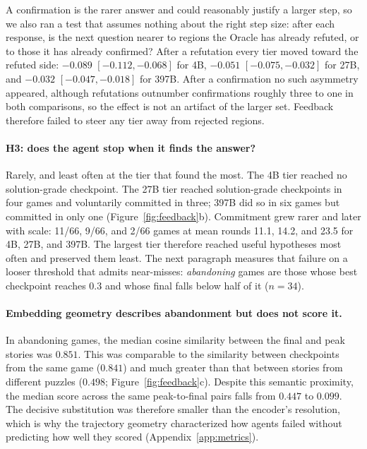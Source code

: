 \documentclass{article}
\begin{document}
A confirmation is the rarer answer and could reasonably justify a larger step,
so we also ran a test that assumes nothing about the right step size: after
each response, is the next question nearer to regions the Oracle has already
refuted, or to those it has already confirmed? After a refutation every tier
moved toward the refuted side: $-0.089$ $[-0.112,-0.068]$ for 4B, $-0.051$
$[-0.075,-0.032]$ for 27B, and $-0.032$ $[-0.047,-0.018]$ for 397B. After a
confirmation no such asymmetry appeared, although refutations outnumber
confirmations roughly three to one in both comparisons, so the effect is not
an artifact of the larger set. Feedback
therefore failed to steer any tier away from rejected regions.

\paragraph{H3: does the agent stop when it finds the answer?}
Rarely, and least often at the tier that found the most. The 4B tier reached no solution-grade checkpoint. The
27B tier reached solution-grade checkpoints in four games and voluntarily
committed in three; 397B did so in six games but committed in only one
(Figure~\ref{fig:feedback}b). Commitment grew rarer and later with
scale: 11/66, 9/66, and 2/66 games at mean rounds 11.1, 14.2, and 23.5 for
4B, 27B, and 397B. The largest tier therefore reached useful hypotheses most
often and preserved them least. The next paragraph measures that failure on a
looser threshold that admits near-misses: \emph{abandoning} games are those
whose best checkpoint reaches $0.3$ and whose final falls below half of it
($n=34$).

\paragraph{Embedding geometry describes abandonment but does not score it.}
In abandoning games, the median cosine similarity between the final and peak
stories was $0.851$. This was comparable to the similarity between
checkpoints from the same game ($0.841$) and much greater than that between
stories from different puzzles ($0.498$; Figure~\ref{fig:feedback}c).
Despite this semantic proximity, the median score across the same
peak-to-final pairs falls from $0.447$ to $0.099$. The decisive substitution
was therefore smaller than the
encoder's resolution, which is why the trajectory geometry characterized how
agents failed without predicting how well they scored
(Appendix~\ref{app:metrics}).
\end{document}
